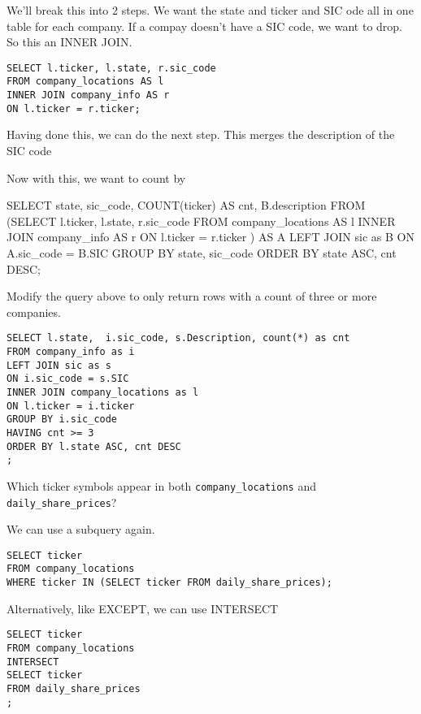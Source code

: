 \documentclass[10pt]{exam}
\begin{document}
\begin{questions}
\begin{solution}
We'll break this into 2 steps.
We want the state and ticker and SIC ode all in one table
for each company. If a compay doesn't have a SIC code, we want to drop.
So this an INNER JOIN.
\begin{lstlisting}
SELECT l.ticker, l.state, r.sic_code
FROM company_locations AS l
INNER JOIN company_info AS r
ON l.ticker = r.ticker;
\end{lstlisting}

Having done this, we can do the next step.
This merges the description of the SIC code 

Now with this, we want to count by


SELECT state, sic_code, COUNT(ticker) AS cnt, B.description
FROM 
   (SELECT l.ticker, l.state, r.sic_code
        FROM company_locations AS l
        INNER JOIN company_info AS r
        ON l.ticker = r.ticker )
      AS A
LEFT JOIN sic as B
ON A.sic_code = B.SIC
GROUP BY state, sic_code
ORDER BY state ASC, cnt DESC;



\end{solution}


\question Modify the query above to only return rows with a count
of three or more companies.

\begin{solution}
\begin{lstlisting}
SELECT l.state,  i.sic_code, s.Description, count(*) as cnt
FROM company_info as i
LEFT JOIN sic as s
ON i.sic_code = s.SIC
INNER JOIN company_locations as l
ON l.ticker = i.ticker
GROUP BY i.sic_code
HAVING cnt >= 3
ORDER BY l.state ASC, cnt DESC
;
\end{lstlisting}
\end{solution}



    \question Which ticker symbols appear in both
    \texttt{company\_locations} and \texttt{daily\_share\_prices}?

\begin{solution}
 We can use a subquery again.
\begin{lstlisting}
SELECT ticker
FROM company_locations
WHERE ticker IN (SELECT ticker FROM daily_share_prices);
\end{lstlisting}

Alternatively, like EXCEPT, we can use INTERSECT
\begin{lstlisting}
SELECT ticker
FROM company_locations
INTERSECT
SELECT ticker
FROM daily_share_prices
;
\end{lstlisting}
\end{solution}


\end{questions}
\end{document}
